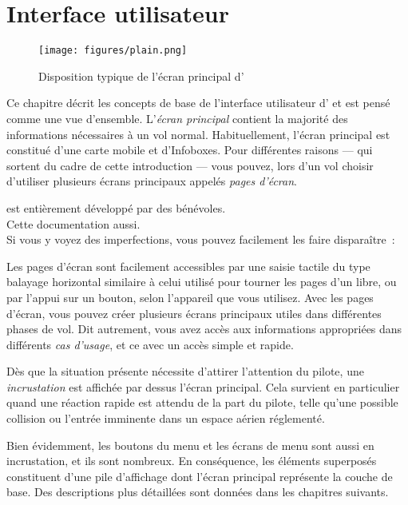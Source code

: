 
\chapter{Interface utilisateur}\label{cha:interface}

\begin{figure}[h]
\texttt{[image: figures/plain.png]}
\caption{Disposition typique de l'écran principal d'\xc{}}
\end{figure}

Ce chapitre décrit les concepts de base de l'interface utilisateur d'\xc{}
et est pensé comme une vue d'ensemble. L'\emph{écran principal} contient la majorité
des informations nécessaires à un vol normal. Habituellement, l'écran principal est
constitué d'une carte mobile et d'Infoboxes. Pour différentes raisons --- qui sortent du
cadre de cette introduction --- vous pouvez, lors d'un vol choisir d'utiliser plusieurs écrans principaux
appelés \emph{pages d'écran}.

\begin{framed}
	\begin{center}
		\xc{} est entièrement développé par des bénévoles.\\
		Cette documentation aussi.\\
		Si vous y voyez des imperfections, vous pouvez facilement les faire disparaître~:\\
	\end{center}
\end{framed}

Les pages d'écran sont facilement accessibles par une saisie tactile du type balayage horizontal
similaire à celui utilisé pour tourner les pages d'un libre, ou par l'appui sur un bouton, selon l'appareil que vous utilisez.
Avec les pages d'écran, vous pouvez créer plusieurs écrans principaux
utiles dans différentes phases de vol. Dit autrement, vous avez
accès aux informations appropriées dans différents \emph{cas d'usage}, et ce
avec un accès simple et rapide.

Dès que la situation présente nécessite d'attirer l'attention du pilote, une
\emph{incrustation} est affichée par dessus l'écran principal. Cela survient en particulier
quand une réaction rapide est attendu de la part du pilote, telle qu'une
possible collision ou l'entrée imminente dans un espace aérien réglementé.

Bien évidemment, les boutons du menu et les écrans de menu sont aussi en incrustation,
et ils sont nombreux. En conséquence, les éléments superposés constituent d'une pile d'affichage dont
l'écran principal représente la couche de base. Des descriptions plus détaillées sont
données dans les chapitres suivants.


